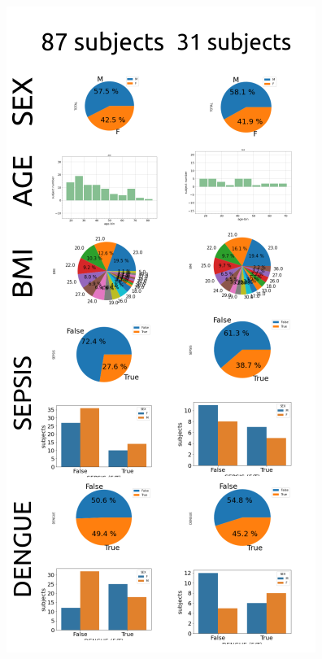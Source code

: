 \documentclass[mlabstract,twocolumn]{jmlr}
\begin{document}
\begin{figure}[htbp]
  {\includegraphics[width=\columnwidth]{../figures/patient-demographics-and-diseases/versions/drawing-v02}}%
\end{figure}
\end{document}
